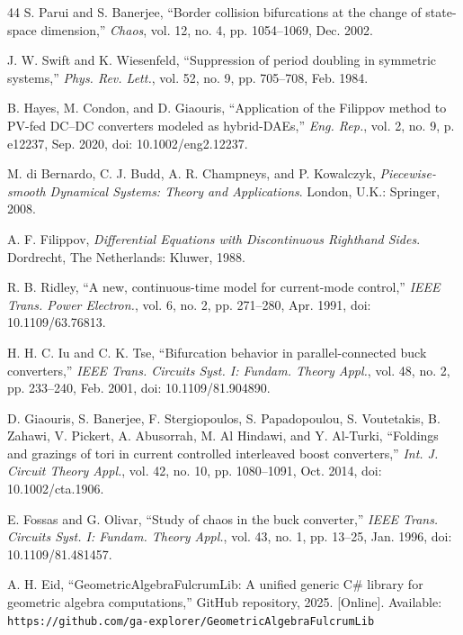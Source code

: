 \documentclass[journal]{IEEEtran}
\begin{document}
\begin{thebibliography}{44}
 S. Parui and S. Banerjee, ``Border collision
bifurcations at the change of state-space dimension,'' \emph{Chaos}, vol. 12, no. 4,
pp. 1054--1069, Dec. 2002.

 J. W. Swift and K. Wiesenfeld,
``Suppression of period doubling in symmetric systems,'' \emph{Phys. Rev.
Lett.}, vol. 52, no. 9, pp. 705--708, Feb. 1984.

 B. Hayes, M. Condon, and D. Giaouris,
``Application of the Filippov method to PV-fed DC--DC converters modeled as
hybrid-DAEs,'' \emph{Eng. Rep.}, vol. 2, no. 9, p. e12237, Sep. 2020,
doi: 10.1002/eng2.12237.

 M. di Bernardo, C. J. Budd, A. R. Champneys, and
P. Kowalczyk, \emph{Piecewise-smooth Dynamical Systems: Theory and
Applications}. London, U.K.:
Springer, 2008.

 A. F. Filippov, \emph{Differential Equations with
Discontinuous Righthand Sides}. Dordrecht, The Netherlands: Kluwer, 1988.

 R. B. Ridley, ``A new, continuous-time model for
current-mode control,'' \emph{IEEE Trans. Power Electron.}, vol. 6, no. 2,
pp. 271--280, Apr. 1991, doi: 10.1109/63.76813.

 H. H. C. Iu and C. K. Tse, ``Bifurcation
behavior in parallel-connected buck converters,'' \emph{IEEE Trans. Circuits
Syst. I: Fundam. Theory Appl.}, vol. 48, no. 2, pp. 233--240, Feb. 2001,
doi: 10.1109/81.904890.

 D. Giaouris, S. Banerjee, F. Stergiopoulos,
S. Papadopoulou, S. Voutetakis, B. Zahawi, V. Pickert, A. Abusorrah,
M. Al Hindawi, and Y. Al-Turki, ``Foldings and grazings of tori in current
controlled interleaved boost converters,'' \emph{Int. J. Circuit Theory
Appl.}, vol. 42, no. 10, pp. 1080--1091, Oct. 2014, doi: 10.1002/cta.1906.

 E. Fossas and G. Olivar, ``Study of chaos in the
buck converter,'' \emph{IEEE Trans. Circuits Syst. I: Fundam. Theory Appl.},
vol. 43, no. 1, pp. 13--25, Jan. 1996, doi: 10.1109/81.481457.

 A. H. Eid, ``GeometricAlgebraFulcrumLib: A unified
generic C\# library for geometric algebra computations,'' GitHub repository,
2025. [Online]. Available:
\texttt{https://github.com/\allowbreak{}ga-explorer/\allowbreak{}GeometricAlgebraFulcrumLib}


\end{thebibliography}
\end{document}
